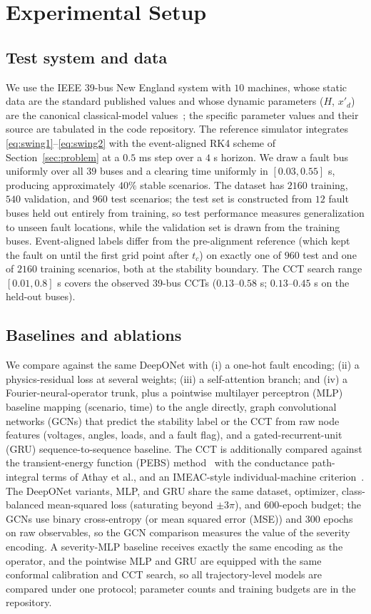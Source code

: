 \documentclass[5p,times]{elsarticle}
\begin{document}
\section{Experimental Setup}
\label{sec:setup}

\subsection{Test system and data}
We use the IEEE 39-bus New England system with $10$ machines, whose static data are the standard
published values and whose dynamic parameters ($H$, $x'_{d}$) are the canonical
classical-model values~\cite{sauer1998dynamics, athay1979transient}; the specific parameter
values and their source are tabulated in the code repository. The reference simulator integrates
\eqref{eq:swing1}--\eqref{eq:swing2} with the event-aligned RK4 scheme of Section~\ref{sec:problem}
at a $0.5$ ms step over a $4$ s horizon. We draw a fault bus uniformly over all $39$ buses and a
clearing time uniformly in $[0.03,0.55]$ s, producing approximately $40\%$ stable scenarios. The
dataset has $2160$ training, $540$ validation, and $960$ test scenarios; the test set is
constructed from $12$ fault buses held out entirely from training, so test performance measures
generalization to unseen fault locations, while the validation set is drawn from the training
buses. Event-aligned labels differ from the pre-alignment reference (which kept the fault on until
the first grid point after $t_c$) on exactly one of $960$ test and one of $2160$ training
scenarios, both at the stability boundary. The CCT search range $[0.01,0.8]$ s covers the observed 39-bus CCTs ($0.13$--$0.58$ s;
$0.13$--$0.45$ s on the held-out buses).

\subsection{Baselines and ablations}
We compare against the same DeepONet with (i) a one-hot fault encoding; (ii) a physics-residual
loss at several weights; (iii) a self-attention branch; and (iv) a Fourier-neural-operator trunk,
plus a pointwise multilayer perceptron (MLP) baseline mapping (scenario, time) to the angle
directly, graph convolutional networks (GCNs) that predict the stability label or the CCT from
raw node features (voltages, angles, loads, and a fault flag), and a gated-recurrent-unit (GRU)
sequence-to-sequence baseline. The CCT is additionally compared against the transient-energy
function (PEBS) method~\cite{athay1979transient} with the conductance path-integral terms of Athay
et al., and an IMEAC-style individual-machine criterion~\cite{wang2018individual}. The DeepONet variants, MLP, and GRU share the same dataset,
optimizer, class-balanced mean-squared loss (saturating beyond $\pm 3\pi$), and $600$-epoch
budget; the GCNs use binary cross-entropy (or mean squared error (MSE)) and $300$ epochs on raw observables, so the
GCN comparison measures the value of the severity encoding. A severity-MLP baseline receives
exactly the same encoding as the operator, and the pointwise MLP and GRU are equipped with the
same conformal calibration and CCT search, so all trajectory-level models are compared under one
protocol; parameter counts and training budgets are in the repository.
\end{document}
